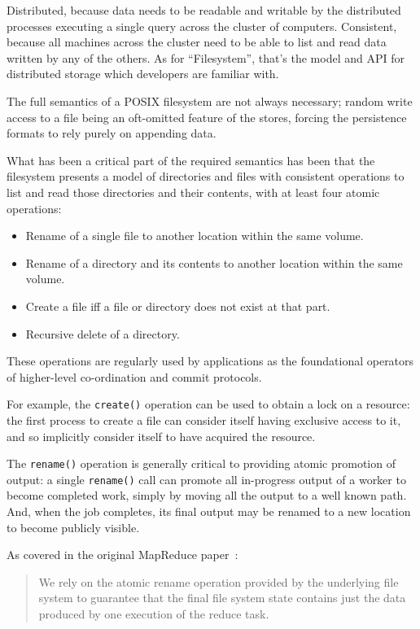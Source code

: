 \documentclass[conference]{IEEEtran}
\begin{document}
Distributed, because data needs to be readable and writable by the distributed
processes executing a single query across the cluster of computers.
Consistent, because all machines across the cluster need to be able to
list and read data written by any of the others.
As for ``Filesystem'', that's the model and API for distributed storage which
developers are familiar with.


The full semantics of a POSIX filesystem are not always necessary;
random write access to a file being an oft-omitted feature of the stores,
forcing the persistence formats to rely purely on appending data.

What has been a critical part of the required semantics has been that the filesystem
presents a model of directories and files with consistent operations to list and
read those directories and their contents, with at least four atomic operations:

\begin{itemize}
  \item Rename of a single file to another location within the same volume.
  \item Rename of a directory and its contents to another location within the same volume.
  \item Create a file iff a file or directory does not exist at that part.
  \item Recursive delete of a directory.
\end{itemize}

These operations are regularly used by applications as the foundational operators of higher-level
co-ordination and commit protocols.

For example, the \texttt{create()} operation can be used to obtain a lock on a resource:
the first process to create a file can consider itself having exclusive access to it,
and so implicitly consider itself to have acquired the resource.

The \texttt{rename()} operation is generally critical to providing atomic promotion
of output: a single \texttt{rename()} call can promote all in-progress output
of a worker to become completed work, simply by moving all the output to a well known path.
And, when the job completes, its final output may be renamed to a new location to become
publicly visible.

As covered in the original MapReduce paper\ \cite{MapReduce}:

\begin{quote}
We rely on the atomic rename operation provided by the underlying file system
to guarantee that the final file system state contains just the data produced
by one execution of the reduce task.
\end{quote}
\end{document}
